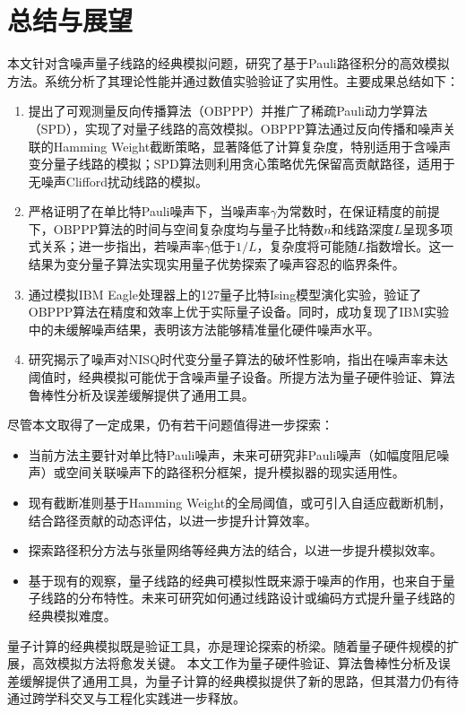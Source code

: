 \chapter{总结与展望}


本文针对含噪声量子线路的经典模拟问题，研究了基于Pauli路径积分的高效模拟方法。系统分析了其理论性能并通过数值实验验证了实用性。主要成果总结如下：
\begin{enumerate}
    \item 提出了可观测量反向传播算法（OBPPP）并推广了稀疏Pauli动力学算法（SPD），实现了对量子线路的高效模拟。OBPPP算法通过反向传播和噪声关联的Hamming Weight截断策略，显著降低了计算复杂度，特别适用于含噪声变分量子线路的模拟；SPD算法则利用贪心策略优先保留高贡献路径，适用于无噪声Clifford扰动线路的模拟。
    \item 严格证明了在单比特Pauli噪声下，当噪声率$\gamma$为常数时，在保证精度的前提下，OBPPP算法的时间与空间复杂度均与量子比特数$n$和线路深度$L$呈现多项式关系；进一步指出，若噪声率$\gamma$低于$1/L$，复杂度将可能随$L$指数增长。这一结果为变分量子算法实现实用量子优势探索了噪声容忍的临界条件。
    \item 通过模拟IBM Eagle处理器上的127量子比特Ising模型演化实验，验证了OBPPP算法在精度和效率上优于实际量子设备。同时，成功复现了IBM实验中的未缓解噪声结果，表明该方法能够精准量化硬件噪声水平。
    \item 研究揭示了噪声对NISQ时代变分量子算法的破坏性影响，指出在噪声率未达阈值时，经典模拟可能优于含噪声量子设备。所提方法为量子硬件验证、算法鲁棒性分析及误差缓解提供了通用工具。
\end{enumerate}

尽管本文取得了一定成果，仍有若干问题值得进一步探索：
\begin{itemize}
    \item 当前方法主要针对单比特Pauli噪声，未来可研究非Pauli噪声（如幅度阻尼噪声）或空间关联噪声下的路径积分框架，提升模拟器的现实适用性。
    \item 现有截断准则基于Hamming Weight的全局阈值，或可引入自适应截断机制，结合路径贡献的动态评估，以进一步提升计算效率。
    \item 探索路径积分方法与张量网络等经典方法的结合，以进一步提升模拟效率。
    \item 基于现有的观察，量子线路的经典可模拟性既来源于噪声的作用，也来自于量子线路的分布特性。未来可研究如何通过线路设计或编码方式提升量子线路的经典模拟难度。
\end{itemize}

量子计算的经典模拟既是验证工具，亦是理论探索的桥梁。随着量子硬件规模的扩展，高效模拟方法将愈发关键。
本文工作为量子硬件验证、算法鲁棒性分析及误差缓解提供了通用工具，为量子计算的经典模拟提供了新的思路，但其潜力仍有待通过跨学科交叉与工程化实践进一步释放。